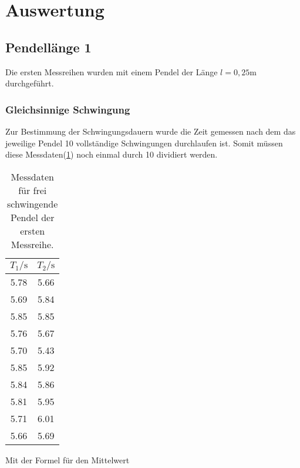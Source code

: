 \newpage
\section{Auswertung}

    \subsection{Pendellänge 1}

        \noindent Die ersten Messreihen wurden mit einem Pendel der Länge $l = 0,25 \si{\m}$ durchgeführt.

        \subsubsection{Gleichsinnige Schwingung}

            \noindent Zur Bestimmung der Schwingungsdauern wurde die Zeit gemessen nach dem das jeweilige Pendel 10 vollständige Schwingungen 
            durchlaufen ist. Somit müssen diese Messdaten(\ref{tab:frei1}) noch einmal durch 10 dividiert werden.

            \begin{table}[ht]
                \centering
                \caption{Messdaten für frei schwingende Pendel der ersten Messreihe.}
                \label{tab:frei1}
                \begin{tabular}{c c}
                 \toprule
                 $T_1 / \si{\s}$ & $T_2 / \si{\s}$\\
                 \midrule
                 5.78  &  5.66 \\
                 5.69  &  5.84 \\
                 5.85  &  5.85 \\
                 5.76  &  5.67 \\
                 5.70  &  5.43 \\
                 5.85  &  5.92 \\
                 5.84  &  5.86 \\
                 5.81  &  5.95 \\
                 5.71  &  6.01 \\
                 5.66  &  5.69 \\
                 \bottomrule
                \end{tabular}
            \end{table}

            \noindent Mit der Formel für den Mittelwert 

